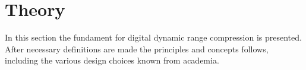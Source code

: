 \documentclass[../main2.tex]{subfiles}
\providecommand{\rootdir}{..}
\begin{document}
\FloatBarrier
\section{Theory} \label{theory}
In this section the fundament for digital dynamic range compression is presented. After necessary definitions are made the principles and concepts follows, including the various design choices known from academia.












\end{document}
